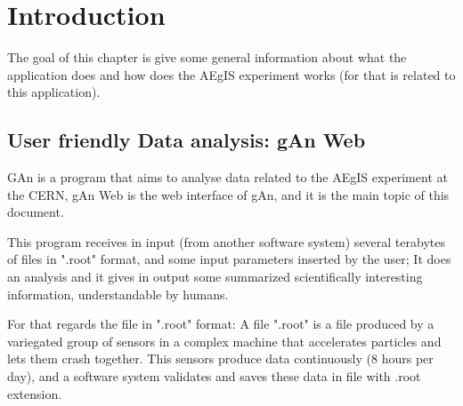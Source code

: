 
\chapter{Introduction} %

\label{Chapter1} %


The goal of this chapter is give some general information about what the application does and how does the AEgIS experiment works (for that is related to this application).

\section{User friendly Data analysis: gAn Web}

GAn is a program that aims to analyse data related to the AEgIS experiment at the CERN, gAn Web is the web interface of gAn, and it is the main topic of this document.
 
This program receives in input (from another software system) several terabytes of files in ".root" format, and some input parameters inserted by the user;
It does an analysis and it gives in output some summarized scientifically interesting information, understandable by humans.   

For that regards the file in ".root" format:
A file ".root" is a file produced by a variegated group of sensors in a complex machine that accelerates particles and lets them crash together. This sensors produce data continuously (8 hours per day), and a software system validates and saves these data in file with .root extension. 

